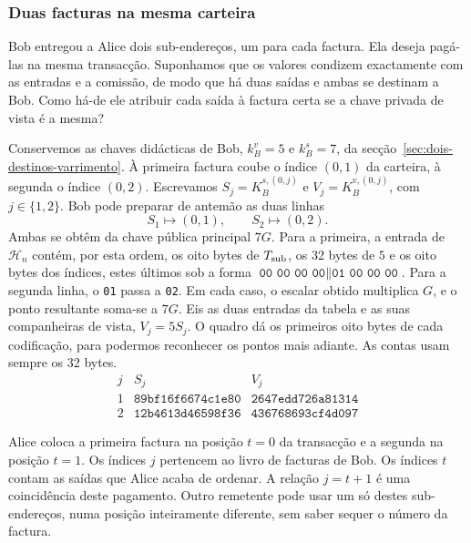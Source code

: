 \subsubsection*{Duas facturas na mesma carteira}

Bob entregou a Alice dois sub-endereços, um para cada factura.
Ela deseja pagá-las na mesma transacção. Suponhamos que os valores
condizem exactamente com as entradas e a comissão, de modo que
há duas saídas e ambas se destinam a Bob. Como há-de ele atribuir
cada saída à factura certa se a chave privada de vista é a mesma?

Conservemos as chaves didácticas de Bob, \(k_B^v=5\) e \(k_B^s=7\),
da secção~\ref{sec:dois-destinos-varrimento}. À primeira factura
coube o índice \((0,1)\) da carteira, à segunda o índice \((0,2)\).
Escrevamos \(S_j=K_B^{s,(0,j)}\) e \(V_j=K_B^{v,(0,j)}\), com
\(j\in\{1,2\}\). Bob pode preparar de antemão as duas linhas
\[
                 S_1\longmapsto(0,1),\qquad
                 S_2\longmapsto(0,2).
\]
Ambas se obtêm da chave pública principal \(7G\). Para a primeira,
a entrada de \(\mathcal H_n\) contém, por esta ordem, os oito bytes
de \(T_{\rm sub}\), os 32 bytes de \(5\) e os oito bytes dos
índices, estes últimos sob a forma
\(\texttt{00 00 00 00}\mathbin\|\texttt{01 00 00 00}\).
Para a segunda linha, o \texttt{01} passa a \texttt{02}. Em cada
caso, o escalar obtido multiplica \(G\), e o ponto resultante
soma-se a \(7G\). Eis as duas entradas da tabela e as suas
companheiras de vista, \(V_j=5S_j\). O quadro dá os primeiros
oito bytes de cada codificação, para podermos reconhecer os
pontos mais adiante. As contas usam sempre os 32 bytes.
\[
\begin{array}{c|ll}
j&S_j&V_j\\ \hline
1&\texttt{89bf16f6674c1e80}&\texttt{2647edd726a81314}\\
2&\texttt{12b4613d46598f36}&\texttt{436768693cf4d097}
\end{array}
\]

Alice coloca a primeira factura na posição \(t=0\) da transacção e
a segunda na posição \(t=1\). Os índices \(j\) pertencem ao livro
de facturas de Bob. Os índices \(t\) contam as saídas que Alice
acaba de ordenar. A relação \(j=t+1\) é uma coincidência deste
pagamento. Outro remetente pode usar um só destes sub-endereços,
numa posição inteiramente diferente, sem saber sequer o número da
factura.

